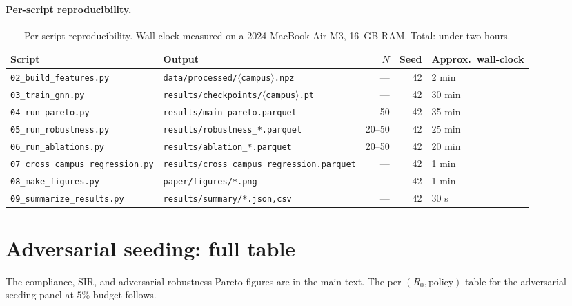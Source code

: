 \documentclass{article}
\begin{document}
\paragraph{Per-script reproducibility.}

\begin{table}[h]
\centering
\small
\begin{tabular}{llrrl}
\toprule
Script & Output & $N$ & Seed & Approx.\ wall-clock \\
\midrule
\texttt{02\_build\_features.py}        & \texttt{data/processed/$\langle$campus$\rangle$.npz}      & ---  & 42 & 2 min \\
\texttt{03\_train\_gnn.py}             & \texttt{results/checkpoints/$\langle$campus$\rangle$.pt} & ---  & 42 & 30 min \\
\texttt{04\_run\_pareto.py}            & \texttt{results/main\_pareto.parquet}                    & 50   & 42 & 35 min \\
\texttt{05\_run\_robustness.py}        & \texttt{results/robustness\_*.parquet}                   & 20--50 & 42 & 25 min \\
\texttt{06\_run\_ablations.py}         & \texttt{results/ablation\_*.parquet}                     & 20--50 & 42 & 20 min \\
\texttt{07\_cross\_campus\_regression.py} & \texttt{results/cross\_campus\_regression.parquet}    & ---  & 42 & 1 min \\
\texttt{08\_make\_figures.py}          & \texttt{paper/figures/*.png}                             & ---  & 42 & 1 min \\
\texttt{09\_summarize\_results.py}     & \texttt{results/summary/*.json,csv}                      & ---  & 42 & 30 s \\
\bottomrule
\end{tabular}
\caption{Per-script reproducibility. Wall-clock measured on a
2024 MacBook Air M3, 16~GB RAM. Total: under two hours.}
\label{tab:repro}
\end{table}

\section{Adversarial seeding: full table}
\label{app:robustness}

The compliance, SIR, and adversarial robustness Pareto figures are
in the main text. The per-$(R_0, \text{policy})$ table for the
adversarial seeding panel at $5\%$ budget follows.
\end{document}
